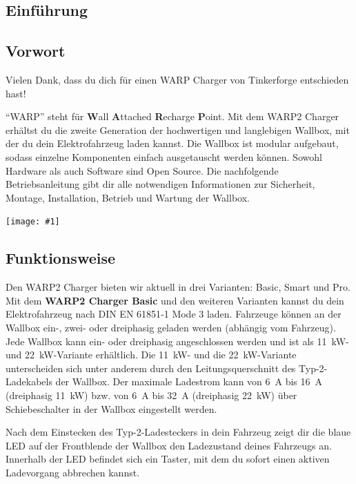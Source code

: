 \documentclass[a4paper,10pt]{article}
\newcommand{\gfx}[1]{\texttt{[image: \#1]}}
\begin{document}
\begin{multicols*}{2}
    \tableofcontents
    \newpage
    \section{Einführung}
    \subsection{Vorwort} Vielen Dank, dass du
    dich für einen WARP Charger von Tinkerforge entschieden hast!

    \enquote{WARP} steht
    für \textbf{W}all \textbf{A}ttached
    \textbf{R}echarge \textbf{P}oint. Mit dem WARP2 Charger
    erhältst du die zweite Generation der hochwertigen und langlebigen Wallbox,
    mit der du dein Elektrofahrzeug laden kannst.
    Die Wallbox ist modular aufgebaut, sodass
    einzelne Komponenten einfach ausgetauscht werden können. Sowohl Hardware als
    auch Software sind Open Source. Die nachfolgende Betriebsanleitung gibt dir
    alle notwendigen Informationen zur Sicherheit, Montage, Installation, Betrieb
    und Wartung der Wallbox.

    \gfx{./img_warp2/resized/type_2_connector_ready}\vspace{-0.3cm}

    \subsection{Funktionsweise}
    \vspace{-0.1cm}
    Den WARP2 Charger bieten wir aktuell in drei Varianten: Basic, Smart und Pro.
    Mit dem \textbf{WARP2 Charger Basic} und den weiteren Varianten kannst du dein
    Elektrofahrzeug nach DIN EN 61851‐1 Mode 3 laden.
    Fahrzeuge können an der Wallbox ein-, zwei- oder dreiphasig geladen werden
    (abhängig vom Fahrzeug). Jede Wallbox kann ein- oder dreiphasig
    angeschlossen werden und ist als \SI{11}{\kilo\watt}- und
    \SI{22}{\kilo\watt}-Variante erhältlich. Die \SI{11}{\kilo\watt}- und
    die \SI{22}{\kilo\watt}-Variante unterscheiden sich unter anderem durch den
    Leitungsquerschnitt des Typ-2-Ladekabels der Wallbox. Der maximale Ladestrom
    kann von \SI{6}{\ampere} bis \SI{16}{\ampere}
    (dreiphasig \SI{11}{\kilo\watt}) bzw. von \SI{6}{\ampere} bis \SI{32}{\ampere} (dreiphasig \SI{22}{\kilo\watt}) über
    Schiebeschalter in der Wallbox eingestellt werden.

    \vspace{-0.1cm}
    Nach dem Einstecken des Typ-2-Ladesteckers in
    dein Fahrzeug zeigt dir die blaue LED auf der Frontblende der Wallbox den
    Ladezustand deines Fahrzeugs an. Innerhalb der LED befindet sich ein Taster, mit dem
    du sofort einen aktiven Ladevorgang abbrechen kannst.


\end{multicols*}
\end{document}

